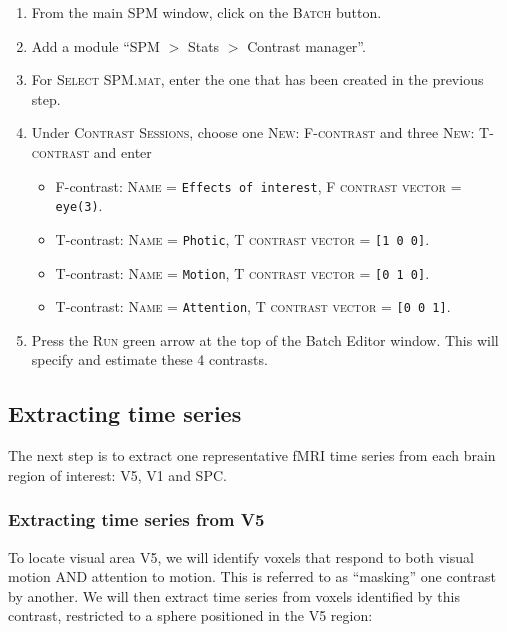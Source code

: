 \begin{enumerate}
 \item From the main SPM window, click on the \textsc{Batch} button.
 \item Add a module ``SPM $>$ Stats $>$ Contrast manager''.
 \item For \textsc{Select SPM.mat}, enter the one that has been created in the previous step.
 \item Under \textsc{Contrast Sessions}, choose one \textsc{New: F-contrast} and three \textsc{New: T-contrast} and enter
 \begin{itemize}
  \item F-contrast: \textsc{Name} = \texttt{Effects of interest}, \textsc{F contrast vector} = \texttt{eye(3)}.
  \item T-contrast: \textsc{Name} = \texttt{Photic}, \textsc{T contrast vector} = \texttt{[1 0 0]}.
  \item T-contrast: \textsc{Name} = \texttt{Motion}, \textsc{T contrast vector} = \texttt{[0 1 0]}.
  \item T-contrast: \textsc{Name} = \texttt{Attention}, \textsc{T contrast vector} = \texttt{[0 0 1]}.
 \end{itemize}
 \item Press the \textsc{Run} green arrow at the top of the Batch Editor window. This will specify and estimate these 4 contrasts.
\end{enumerate}

\subsection{Extracting time series}

The next step is to extract one representative fMRI time series from each brain region of interest: V5, V1 and SPC.

\subsubsection{Extracting time series from V5}

To locate visual area V5, we will identify voxels that respond to both visual motion AND attention to motion. This is referred to as ``masking'' one contrast by another. We will then extract time series from voxels identified by this contrast, restricted to a sphere positioned in the V5 region:

